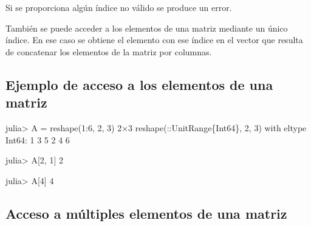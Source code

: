 \documentclass[
  letterpaper,
  DIV=11,
  numbers=noendperiod]{scrreprt}
\newenvironment{Shaded}{\begin{snugshade}}{\end{snugshade}}
\newcommand{\DataTypeTok}[1]{\textcolor[rgb]{0.68,0.00,0.00}{#1}}
\newcommand{\FloatTok}[1]{\textcolor[rgb]{0.68,0.00,0.00}{#1}}
\newcommand{\FunctionTok}[1]{\textcolor[rgb]{0.28,0.35,0.67}{#1}}
\newcommand{\NormalTok}[1]{\textcolor[rgb]{0.00,0.23,0.31}{#1}}
\newcommand{\OperatorTok}[1]{\textcolor[rgb]{0.37,0.37,0.37}{#1}}
\begin{document}
\begin{tcolorbox}[enhanced jigsaw, colbacktitle=quarto-callout-warning-color!10!white, coltitle=black, opacityback=0, opacitybacktitle=0.6, bottomtitle=1mm, leftrule=.75mm, toprule=.15mm, bottomrule=.15mm, toptitle=1mm, breakable, colframe=quarto-callout-warning-color-frame, colback=white, rightrule=.15mm, titlerule=0mm, title=\textcolor{quarto-callout-warning-color}{\faExclamationTriangle}\hspace{0.5em}{Warning}, arc=.35mm, left=2mm]
Si se proporciona algún índice no válido se produce un error.
\end{tcolorbox}

También se puede acceder a los elementos de una matriz mediante un único
índice. En ese caso se obtiene el elemento con ese índice en el vector
que resulta de concatenar los elementos de la matriz por columnas.

\hypertarget{ejemplo-de-acceso-a-los-elementos-de-una-matriz}{%
\subsection{Ejemplo de acceso a los elementos de una
matriz}\label{ejemplo-de-acceso-a-los-elementos-de-una-matriz}}

\begin{Shaded}
\begin{Highlighting}[]
\NormalTok{julia}\OperatorTok{\textgreater{}}\NormalTok{ A }\OperatorTok{=} \FunctionTok{reshape}\NormalTok{(}\FloatTok{1}\OperatorTok{:}\FloatTok{6}\NormalTok{, }\FloatTok{2}\NormalTok{, }\FloatTok{3}\NormalTok{)}
\FloatTok{2}\OperatorTok{×}\FloatTok{3} \FunctionTok{reshape}\NormalTok{(}\OperatorTok{::}\DataTypeTok{UnitRange\{Int64\}}\NormalTok{, }\FloatTok{2}\NormalTok{, }\FloatTok{3}\NormalTok{) with eltype }\DataTypeTok{Int64}\OperatorTok{:}
 \FloatTok{1}  \FloatTok{3}  \FloatTok{5}
 \FloatTok{2}  \FloatTok{4}  \FloatTok{6}

\NormalTok{julia}\OperatorTok{\textgreater{}}\NormalTok{ A[}\FloatTok{2}\NormalTok{, }\FloatTok{1}\NormalTok{]}
\FloatTok{2}

\NormalTok{julia}\OperatorTok{\textgreater{}}\NormalTok{ A[}\FloatTok{4}\NormalTok{]}
\FloatTok{4}
\end{Highlighting}
\end{Shaded}

\hypertarget{acceso-a-muxfaltiples-elementos-de-una-matriz}{%
\subsection{Acceso a múltiples elementos de una
matriz}\label{acceso-a-muxfaltiples-elementos-de-una-matriz}}
\end{document}
